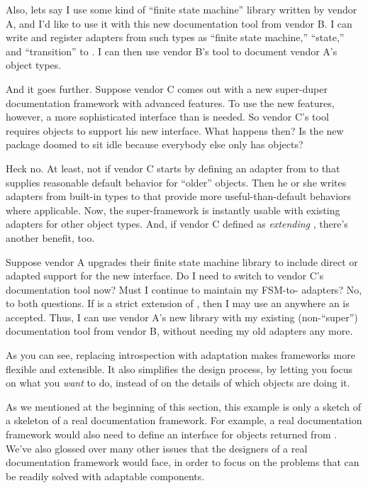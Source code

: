 \begin{verbatim%
}
\begin{verbatim%
}
Also, lets say I use some kind of ``finite state machine'' library written by
vendor A, and I'd like to use it with this new documentation tool from vendor
B.  I can write and register adapters from such types as ``finite state
machine,'' ``state,'' and ``transition'' to .  I can then
use vendor B's tool to document vendor A's object types.

And it goes further.  Suppose vendor C comes out with a new super-duper
documentation framework with advanced features.  To use the new features,
however, a more sophisticated interface than  is needed.
So vendor C's tool requires objects to support his new
 interface.  What happens then?  Is the new package
doomed to sit idle because everybody else only has 
objects?

Heck no.  At least, not if vendor C starts by defining an adapter from
 to  that supplies reasonable
default behavior for ``older'' objects.  Then he or she writes adapters from
built-in types to  that provide more
useful-than-default behaviors where applicable.  Now, the super-framework is
instantly usable with existing adapters for other object types.  And, if vendor
C defined  as \emph{extending} ,
there's another benefit, too.



Suppose vendor A upgrades their finite state machine library to include direct
or adapted support for the new  interface.  Do I need
to switch to vendor C's documentation tool now?  Must I continue to maintain my
FSM-to- adapters?  No, to both questions.  If
 is a strict extension of , then
I may use an  anywhere an  is
accepted.  Thus, I can use vendor A's new library with my existing
(non-``super'') documentation tool from vendor B, without needing my old
adapters any more.

As you can see, replacing introspection with adaptation makes frameworks more
flexible and extensible.  It also simplifies the design process, by letting you
focus on what you \emph{want} to do, instead of on the details of which objects
are doing it.

As we mentioned at the beginning of this section, this example is only a sketch
of a skeleton of a real documentation framework.  For example, a real
documentation framework would also need to define an 
interface for objects returned from .  We've also
glossed over many other issues that the designers of a real documentation
framework would face, in order to focus on the problems that can be readily
solved with adaptable components.


\end{verbatim%
}
\end{verbatim%
}

